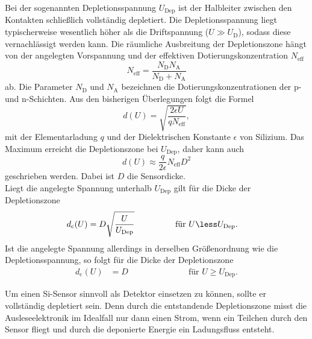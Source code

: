Bei der sogenannten Depletionsspannung $U_\text{Dep}$ ist der Halbleiter zwischen den Kontakten schließlich vollständig depletiert.
Die Depletionsspannung liegt typischerweise wesentlich höher als die
Driftspannung ($U \gg U_\text{D}$), sodass diese vernachlässigt werden kann. Die räumliche Ausbreitung der Depletionszone hängt von der angelegten Vorspannung und der effektiven Dotierungskonzentration
$N_\text{eff}$
\begin{equation}
  N_\text{eff} = \frac{N_\text{D}N_\text{A}}{N_\text{D}+N_\text{A}}
\end{equation}
ab.
Die Parameter $N_\text{D}$ und $N_\text{A}$ bezeichnen die Dotierungskonzentrationen der p- und n-Schichten. Aus den bisherigen Überlegungen folgt die Formel
\begin{equation}
  d(U) = \sqrt{\frac{2\epsilon U}{q N_\text{eff}}},
\end{equation}
mit der Elementarladung $q$ und der Dielektrischen Konstante $\epsilon$ von Silizium. Das Maximum erreicht die Depletionszone bei $U_\text{Dep}$, daher kann auch
\begin{equation}
  d(U) \approx \frac{q}{2\epsilon} N_\text{eff}D^2
\end{equation}
geschrieben werden. Dabei ist $D$ die Sensordicke.\\
Liegt die angelegte Spannung unterhalb $U_\text{Dep}$ gilt für die Dicke der Depletionszone
\begin{align}
  d_\text{c}(U) &= D\sqrt{\frac{U}{U_\text{Dep}}} \hspace{1.7cm}\text{für } U \less U_\text{Dep}.
  \label{eqn:dicke-depletionszone}
\end{align}
Ist die angelegte Spannung allerdings in derselben Größenordnung wie die Depletionsspannung, so folgt für die Dicke der Depletionszone
 \begin{align*}
   d_\text{c}(U) &= D \hspace{3cm}\text{für } U \geq U_\text{Dep}.
 \end{align*}

Um einen Si-Sensor sinnvoll als Detektor einsetzen zu können, sollte er vollständig depletiert sein. Denn durch die entstandende Depletionszone misst die Ausleseelektronik im Idealfall nur dann einen Strom, wenn ein Teilchen durch den Sensor fliegt und durch die deponierte Energie ein Ladungsfluss entsteht.

